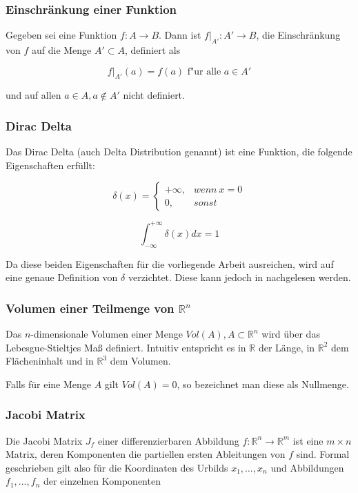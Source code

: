 \documentclass[a4paper,fontsize=12pt,toc=bib,halfparskip]{scrartcl}
\begin{document}
\subsubsection{Einschr\"ankung einer Funktion}
Gegeben sei eine Funktion $f: A \rightarrow B$. Dann ist $f|_{A'}: A' \rightarrow B$, die Einschr\"ankung von $f$ auf die Menge $A' \subset A$, definiert als 

\begin{equation}
	f|_{A'}(a) = f(a) \text{ f"ur alle } a \in A'
\end{equation}

und auf allen $a \in A, a \notin A'$ nicht definiert. 

\subsubsection{Dirac Delta}
Das Dirac Delta (auch Delta Distribution genannt) ist eine Funktion, die folgende Eigenschaften erf\"ullt:

\begin{equation}
	\delta(x)=
	\left\{
	\begin{array}{ll}
		+\infty, & wenn~x = 0\\
		0, & sonst
	\end{array}
	\right.
\end{equation}

\begin{equation}
	\int_{-\infty}^{+\infty}\delta(x)dx = 1
\end{equation}

Da diese beiden Eigenschaften f\"ur die vorliegende Arbeit ausreichen, wird auf eine genaue Definition von $\delta$ verzichtet. Diese kann jedoch in \cite[S.~100~ff.]{kusse2010mathematical} nachgelesen werden.


\subsubsection{Volumen einer Teilmenge von \texorpdfstring{$\mathbb{R}^n$}{}}
Das $n$-dimensionale Volumen einer Menge $Vol(A), A \subset \mathbb{R}^n$ wird \"uber das Lebesgue-Stieltjes Ma{\ss} definiert\cite{kusolitsch2014mass}. Intuitiv entspricht es in $\mathbb{R}$ der L\"ange, in $\mathbb{R}^2$ dem Fl\"acheninhalt und in $\mathbb{R}^3$ dem Volumen.

Falls f\"ur eine Menge $A$ gilt $Vol(A)=0$, so bezeichnet man diese als Nullmenge.

\subsubsection{Jacobi Matrix}
Die Jacobi Matrix $J_f$ einer differenzierbaren Abbildung $f: \mathbb{R}^n \rightarrow \mathbb{R}^m$ ist eine $m \times n$ Matrix, deren Komponenten die partiellen ersten Ableitungen von $f$ sind. Formal geschrieben gilt also f\"ur die Koordinaten des Urbilds $x_1, \dots, x_n$ und Abbildungen $f_1, ..., f_n$ der einzelnen Komponenten
\end{document}
